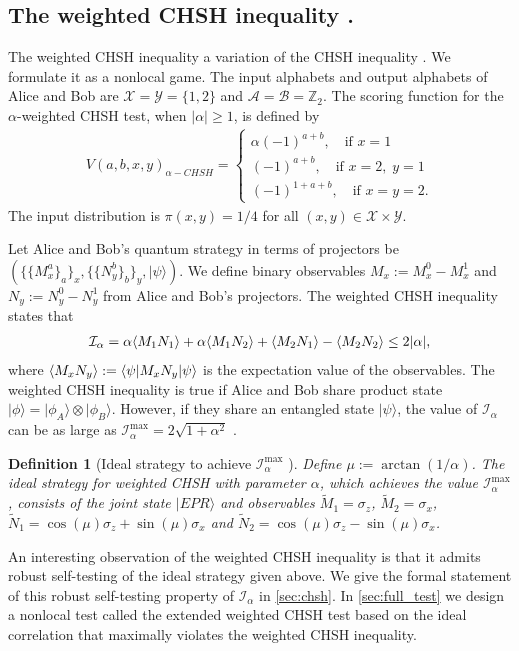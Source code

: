 \documentclass[11pt,letterpaper]{article}
\newcommand{\ket}[1]{|#1\rangle}
\newcommand{\bra}[1]{\langle#1|}
\newcommand{\x}{\otimes}
\DeclarePairedDelimiter{\ip}{\langle}{\rangle}
\newcommand{\Z}{\mathbb{Z}}
\newcommand{\calX}{\mathcal{X}}
\newcommand{\calY}{\mathcal{Y}}
\newcommand{\calA}{\mathcal{A}}
\newcommand{\calB}{\mathcal{B}}
\newcommand{\1}{\mathbb{1}}
\newcommand{\paulix}{\sigma_x}
\newcommand{\pauliz}{\sigma_z}
\newcommand{\tM}{\tilde{M}}
\newcommand{\tN}{\tilde{N}}
\newcommand{\I}{\mathcal{I}}
\newtheorem{definition}[theorem]{Definition}
\theoremstyle{definition}
\begin{document}
\subsection{The weighted CHSH inequality \cite{acin2012}.}
The weighted CHSH inequality a variation of the CHSH inequality \cite{chsh}. 
We formulate it as a nonlocal game.
The input alphabets and output alphabets of Alice and Bob are
$\calX = \calY = \{1, 2\}$ and $\calA = \calB = \Z_2$.
The scoring function for the $\alpha$-weighted CHSH test, when $|\alpha|\geq 1$, is defined by
\begin{align}
	V(a,b,x,y)_{\alpha-CHSH} = 
	\begin{cases}
		\alpha (-1)^{a + b}, \quad \text{if } x = 1 \\
		(-1)^{a + b}, \quad \text{if } x = 2,\; y = 1 \\
		(-1)^{1 + a + b}, \quad \text{if } x = y = 2.
	\end{cases}
\end{align}
The input distribution is $\pi(x,y) = 1/4$ for all $(x,y) \in \calX \times \calY$.

Let Alice and Bob's quantum strategy in terms of projectors be $( \{\{M_x^a\}_a\}_x, \{\{N_y^b\}_b\}_y, \ket{\psi})$. 
We define binary observables $M_x := M_x^0 - M_x^1$ and $N_y := N_y^0 - N_y^1$ from Alice and Bob's projectors.
The weighted CHSH inequality states that 
\begin{align}
	\label{eq:chsh_op}
	\I_\alpha = \alpha\ip{M_1N_1}+\alpha\ip{M_1N_2} + \ip{M_2N_1} - \ip{M_2N_2}\leq 2|\alpha|,
\end{align}
where $\ip{M_x N_y} := \bra{\psi} M_x N_y \ket{\psi}$ is the expectation value of the observables. 
The weighted CHSH inequality is true 
if Alice and Bob share product state $\ket{\phi} = \ket{\phi_A} \x \ket{\phi_B}$.
However, if they share an entangled state $\ket{\psi}$, the value of $\I_\alpha$ can be as large as
$ \I_\alpha^{\max} = 2\sqrt{1+\alpha^2}$ \cite{acin2012}.
\begin{definition}[Ideal strategy to achieve $\I_\alpha^{\max}$ \cite{acin2012}]
	\label{def:ideal}
	Define $\mu := \arctan(1/\alpha)$.
	The ideal strategy for weighted CHSH with parameter $\alpha$, which achieves the value $\I_\alpha^{\max}$, 
	consists of the joint state $\ket{EPR}$ and observables $\tM_1 = \pauliz$, $\tM_2 = \paulix$,
	$\tN_1 = \cos(\mu) \pauliz+ \sin(\mu) \paulix$ and $\tN_2 = \cos(\mu) \pauliz - \sin(\mu) \paulix$.
\end{definition}
An interesting observation of the weighted CHSH inequality is that it admits robust self-testing of the ideal strategy given
above. 
We give the formal statement of this robust self-testing property of $\I_\alpha$ in \cref{sec:chsh}.
In \cref{sec:full_test} we design
a nonlocal test called the extended weighted CHSH test based on 
the ideal correlation that maximally violates the weighted CHSH inequality.
\end{document}
